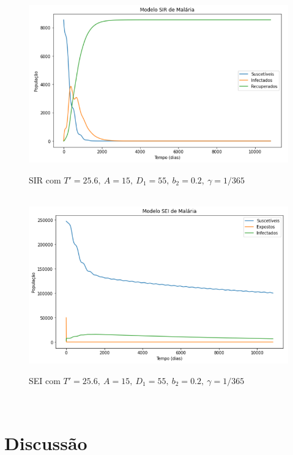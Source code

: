 \documentclass[12pt]{article}
\begin{document}
\\
\begin{figure}[!ht]
        \centering
        \hbox{\hspace{3.5em} \includegraphics[scale=0.6] {SIR_R0_near1.png}}
        \caption{SIR com $T'=25.6, \ A=15, \ D_1=55, \ b_2=0.2, \ \gamma=1/365$}
\end{figure} 
\begin{figure}[!ht]
        \centering
        \hbox{\hspace{3.5em} \includegraphics[scale=0.6] {SEI_R0_near1.png}}
        \caption{SEI com $T'=25.6, \ A=15, \ D_1=55, \ b_2=0.2, \ \gamma=1/365$}
\end{figure}
\\


\newpage
\section{Discussão}
\end{document}
